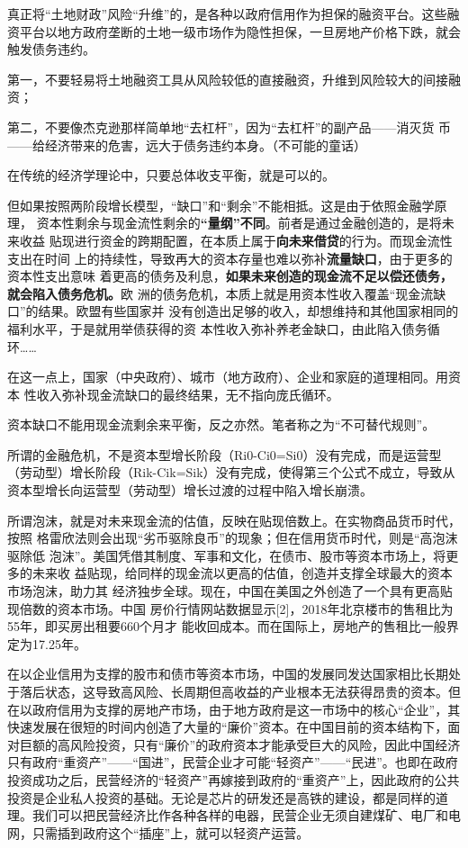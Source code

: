 真正将“土地财政”风险“升维”的，是各种以政府信用作为担保的融资平台。这些融资平台以地方政府垄断的土地一级市场作为隐性担保，一旦房地产价格下跌，就会触发债务违约。

第一，不要轻易将土地融资工具从风险较低的直接融资，升维到风险较大的间接融资；

第二，不要像杰克逊那样简单地“去杠杆”，因为“去杠杆”的副产品——消灭货
币——给经济带来的危害，远大于债务违约本身。（不可能的童话）

在传统的经济学理论中，只要总体收支平衡，就是可以的。

但如果按照两阶段增长模型，“缺口”和“剩余”不能相抵。这是由于依照金融学原理，
资本性剩余与现金流性剩余的\textbf{“量纲”不同}。前者是通过金融创造的，是将未来收益
贴现进行资金的跨期配置，在本质上属于\textbf{向未来借贷}的行为。而现金流性支出在时间
上的持续性，导致再大的资本存量也难以弥补\textbf{流量缺口}，由于更多的资本性支出意味
着更高的债务及利息，\textbf{如果未来创造的现金流不足以偿还债务，就会陷入债务危机。}欧
洲的债务危机，本质上就是用资本性收入覆盖“现金流缺口”的结果。欧盟有些国家并
没有创造出足够的收入，却想维持和其他国家相同的福利水平，于是就用举债获得的资
本性收入弥补养老金缺口，由此陷入债务循环……


在这一点上，国家（中央政府）、城市（地方政府）、企业和家庭的道理相同。用资本
性收入弥补现金流缺口的最终结果，无不指向庞氏循环。

资本缺口不能用现金流剩余来平衡，反之亦然。笔者称之为“不可替代规则”。

所谓的金融危机，不是资本型增长阶段（Ri0-Ci0=Si0）没有完成，而是运营型（劳动型）增长阶段（Rik-Cik=Sik）没有完成，使得第三个公式不成立，导致从资本型增长向运营型（劳动型）增长过渡的过程中陷入增长崩溃。

所谓泡沫，就是对未来现金流的估值，反映在贴现倍数上。在实物商品货币时代，按照
格雷欣法则会出现“劣币驱除良币”的现象；但在信用货币时代，则是“高泡沫驱除低
泡沫”。美国凭借其制度、军事和文化，在债市、股市等资本市场上，将更多的未来收
益贴现，给同样的现金流以更高的估值，创造并支撑全球最大的资本市场泡沫，助力其
经济独步全球。现在，中国在美国之外创造了一个具有更高贴现倍数的资本市场。中国
房价行情网站数据显示[2]，2018年北京楼市的售租比为55年，即买房出租要660个月才
能收回成本。而在国际上，房地产的售租比一般界定为17.25年。


在以企业信用为支撑的股市和债市等资本市场，中国的发展同发达国家相比长期处于落后状态，这导致高风险、长周期但高收益的产业根本无法获得昂贵的资本。但在以政府信用为支撑的房地产市场，由于地方政府是这一市场中的核心“企业”，其快速发展在很短的时间内创造了大量的“廉价”资本。在中国目前的资本结构下，面对巨额的高风险投资，只有“廉价”的政府资本才能承受巨大的风险，因此中国经济只有政府“重资产”——“国进”，民营企业才可能“轻资产”——“民进”。也即在政府投资成功之后，民营经济的“轻资产”再嫁接到政府的“重资产”上，因此政府的公共投资是企业私人投资的基础。无论是芯片的研发还是高铁的建设，都是同样的道理。我们可以把民营经济比作各种各样的电器，民营企业无须自建煤矿、电厂和电网，只需插到政府这个“插座”上，就可以轻资产运营。

